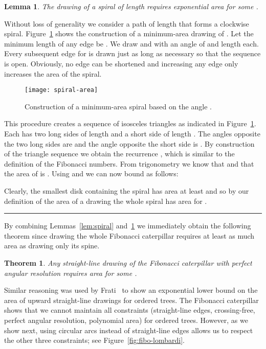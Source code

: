 \documentclass[11pt]{article}
\newtheorem{lemma}{Lemma}
\newtheorem{theorem}{Theorem}
\newcommand{\qed}{\hspace*{\fill}\rule{6pt}{6pt}}
\newenvironment{proof}{\noindent{\bf Proof:}}{\bigskip} \makeatletter
\begin{document}
\begin{lemma}\label{lem:spiral-area}
	The drawing of a spiral of length  requires exponential area  for some .
\end{lemma}
\begin{proof}
	Without loss of generality we consider a path  of length  that forms a clockwise spiral. 
	Figure~\ref{fig:spiral-area} shows the construction of a minimum-area drawing of . 
	Let the minimum length of any edge be . 
	We draw  and  with an angle of  and length  each.
	Every subsequent edge  for  is drawn just as long as necessary so that the sequence  is open.
	Obviously, no edge can be shortened and increasing any edge only increases the area of the spiral.
	
	\begin{figure}[htbp]
		\centering
			\texttt{[image: spiral-area]}
		\caption{Construction of a minimum-area spiral based on the angle .}
		\label{fig:spiral-area}
	\end{figure}
	
	This procedure creates a sequence of isosceles triangles  as indicated in Figure~\ref{fig:spiral-area}.
	Each  has two long sides of length  and a short side of length . 
	The angles opposite the two long sides are  and the angle opposite the short side is .
	By construction of the triangle sequence we obtain the recurrence , which is similar to the definition of the Fibonacci numbers.
	From trigonometry we know that  and that the area of  is .
	Using  and  we can now bound  as follows:
	
	Clearly, the smallest disk containing the spiral has area at least  and so by our definition of the area of a drawing the whole spiral has area  for . \qed
\end{proof}

By combining Lemmas~\ref{lem:spiral} and~\ref{lem:spiral-area} we immediately obtain the following theorem since drawing the whole Fibonacci caterpillar  requires at least as much area as drawing only its spine.

\begin{theorem}\label{thm:straight-expo}
	Any straight-line drawing of the Fibonacci caterpillar  with perfect angular resolution requires area  for some .
\end{theorem}



Similar reasoning was used by Frati~\cite{f-mapuddtofdag-08} to show an exponential lower bound on the area of upward straight-line drawings for ordered trees.
The Fibonacci caterpillar shows that we cannot maintain all
constraints (straight-line edges, crossing-free, perfect angular
resolution, polynomial area) for ordered trees. However, as we show
next, using circular arcs instead of straight-line edges allows us
to respect the other three constraints; see Figure~\ref{fig:fibo-lombardi}.
\end{document}
